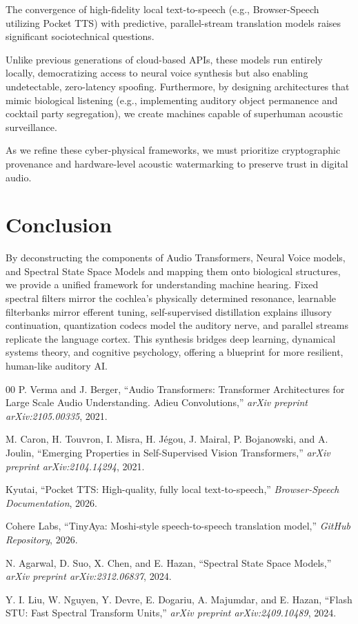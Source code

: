 \documentclass[conference]{IEEEtran}
\begin{document}
The convergence of high-fidelity local text-to-speech (e.g., Browser-Speech utilizing Pocket TTS) with predictive, parallel-stream translation models raises significant sociotechnical questions. 

Unlike previous generations of cloud-based APIs, these models run entirely locally, democratizing access to neural voice synthesis but also enabling undetectable, zero-latency spoofing. Furthermore, by designing architectures that mimic biological listening (e.g., implementing auditory object permanence and cocktail party segregation), we create machines capable of superhuman acoustic surveillance. 

As we refine these cyber-physical frameworks, we must prioritize cryptographic provenance and hardware-level acoustic watermarking to preserve trust in digital audio.

\section{Conclusion}

By deconstructing the components of Audio Transformers, Neural Voice models, and Spectral State Space Models and mapping them onto biological structures, we provide a unified framework for understanding machine hearing. Fixed spectral filters mirror the cochlea's physically determined resonance, learnable filterbanks mirror efferent tuning, self-supervised distillation explains illusory continuation, quantization codecs model the auditory nerve, and parallel streams replicate the language cortex. This synthesis bridges deep learning, dynamical systems theory, and cognitive psychology, offering a blueprint for more resilient, human-like auditory AI.

\begin{thebibliography}{00}
 P. Verma and J. Berger, ``Audio Transformers: Transformer Architectures for Large Scale Audio Understanding. Adieu Convolutions,'' \emph{arXiv preprint arXiv:2105.00335}, 2021.

 M. Caron, H. Touvron, I. Misra, H. Jégou, J. Mairal, P. Bojanowski, and A. Joulin, ``Emerging Properties in Self-Supervised Vision Transformers,'' \emph{arXiv preprint arXiv:2104.14294}, 2021.

 Kyutai, ``Pocket TTS: High-quality, fully local text-to-speech,'' \emph{Browser-Speech Documentation}, 2026.

 Cohere Labs, ``TinyAya: Moshi-style speech-to-speech translation model,'' \emph{GitHub Repository}, 2026.

 N. Agarwal, D. Suo, X. Chen, and E. Hazan, ``Spectral State Space Models,'' \emph{arXiv preprint arXiv:2312.06837}, 2024.

 Y. I. Liu, W. Nguyen, Y. Devre, E. Dogariu, A. Majumdar, and E. Hazan, ``Flash STU: Fast Spectral Transform Units,'' \emph{arXiv preprint arXiv:2409.10489}, 2024.
\end{thebibliography}
\end{document}
